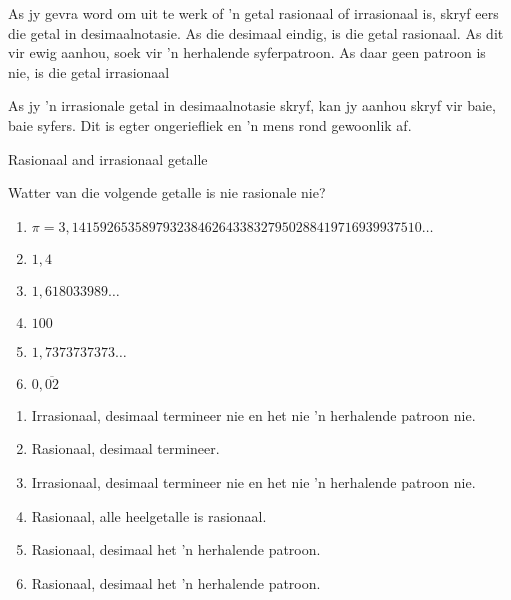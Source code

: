 \par
As jy gevra word om uit te werk of ’n getal rasionaal of irrasionaal is, skryf eers die getal in desimaalnotasie. As die desimaal eindig, is die getal rasionaal. As dit vir ewig aanhou, soek vir ’n herhalende syferpatroon. As daar geen patroon is nie, is die getal irrasionaal
\par 
As jy ’n irrasionale getal in desimaalnotasie skryf, kan jy aanhou skryf vir baie, baie
syfers. Dit is egter ongeriefliek en ’n mens rond gewoonlik af.\par
\begin{wex}{Rasionaal and irrasionaal getalle}
{
\begin{minipage}{\textwidth}
Watter van die volgende getalle is nie rasionale nie?\\

\begin{enumerate}[itemsep=5pt, label=\textbf{\arabic*}. ] 
\item $\pi =3,14159265358979323846264338327950288419716939937510\ldots$
\item $1,4$
\item $1,618033989\ldots$
\item $100$
\item $1,7373737373\ldots$
\item $0,\overline{02}$
\end{enumerate}
\end{minipage}
}
{
\begin{minipage}{\textwidth}
\begin{enumerate}[itemsep=5pt, label=\textbf{\arabic*}. ] 
\item Irrasionaal, desimaal termineer nie en het nie 'n herhalende patroon nie. 
\item Rasionaal, desimaal termineer.
\item Irrasionaal, desimaal termineer nie en het nie 'n herhalende patroon nie. 
\item Rasionaal, alle heelgetalle is rasionaal.
\item Rasionaal, desimaal het 'n herhalende patroon.
\item Rasionaal, desimaal het 'n herhalende patroon.
\end{enumerate}
\end{minipage}
}
\end{wex}

